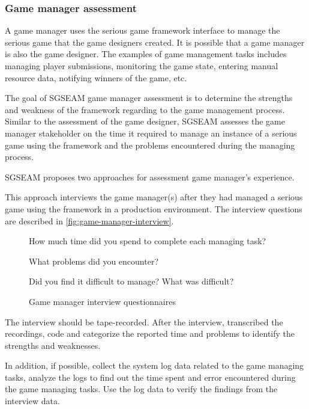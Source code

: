 \subsubsection{Game manager assessment}

A game manager uses the serious game framework interface to manage the serious game that the game
designers created. It is possible that a game manager is also the game designer.
The examples of game management tasks includes managing player submissions, monitoring the game 
state, entering manual resource data, notifying winners of the game, etc.

The goal of SGSEAM game manager assessment is to determine the strengths and weakness of the framework 
regarding to the game management process. Similar to the assessment of the game designer, SGSEAM assesses 
the game manager stakeholder on the time it required to manage an instance of a serious game using the framework
and the problems encountered during the managing process.

SGSEAM proposes two approaches for assessment game manager's experience.

\label{Post-hoc game manager interview}

This approach interviews the game manager(s) after they had managed a serious game using the framework 
in a production environment. The interview questions are described in \autoref{fig:game-manager-interview}.
 
\begin{figure}[ht!]
\begin{mybox}
\begin{compactenum}
\item How much time did you spend to complete each managing task?
\item What problems did you encounter?
\item Did you find it difficult to manage? What was difficult?
\end{compactenum}
\end{mybox}
\caption{Game manager interview questionnaires}
\label{fig:game-manager-interview}  
\end{figure}

The interview should be tape-recorded. After the interview, transcribed the recordings, code and categorize the reported 
time and problems to identify the strengths and weaknesses.

In addition, if possible, collect the system log data related to the game managing tasks, analyze the logs to find out the time 
spent and error encountered during the game managing tasks. Use the log data to verify the findings from the interview data.

